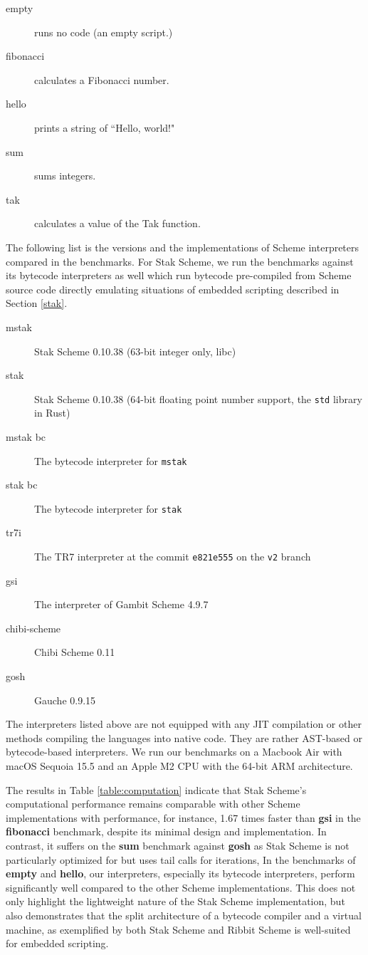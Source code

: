 \documentclass[sigplan]{acmart}
\begin{document}
\begin{description}
  \item[empty] runs no code (an empty script.)
  \item[fibonacci] calculates a Fibonacci number.
  \item[hello] prints a string of ``Hello, world!"
  \item[sum] sums integers.
  \item[tak] calculates a value of the Tak function.
\end{description}

The following list is the versions and the implementations of
Scheme interpreters compared in the benchmarks.
For Stak Scheme, we run the benchmarks against its bytecode interpreters as well
which run bytecode pre-compiled from Scheme source code directly
emulating situations of embedded scripting described in Section \ref{stak}.

\begin{description}
  \item[mstak] Stak Scheme 0.10.38 (63-bit integer only, libc)
  \item[stak] Stak Scheme 0.10.38 (64-bit floating point number support, the
    \texttt{std} library in Rust)
  \item[mstak bc] The bytecode interpreter for \texttt{mstak}
  \item[stak bc] The bytecode interpreter for \texttt{stak}
  \item[tr7i] The TR7 interpreter at the commit \texttt{e821e555}
    on the \texttt{v2} branch
  \item[gsi] The interpreter of Gambit Scheme 4.9.7
  \item[chibi-scheme] Chibi Scheme 0.11
  \item[gosh] Gauche 0.9.15
\end{description}

The interpreters listed above are not equipped with any JIT compilation
or other methods compiling the languages into native code.
They are rather AST-based or bytecode-based interpreters.
We run our benchmarks on a Macbook Air with macOS Sequoia 15.5 and an Apple
M2 CPU with the 64-bit ARM architecture.

The results in Table \ref{table:computation} indicate that Stak
Scheme's computational performance remains comparable with other
Scheme implementations with performance, for instance, 1.67 times
faster than \textbf{gsi} in the \textbf{fibonacci} benchmark,
despite its minimal design and implementation.
In contrast, it suffers on the \textbf{sum} benchmark against
\textbf{gosh} as Stak Scheme is not
particularly optimized for but uses tail calls for iterations,
In the benchmarks of \textbf{empty} and \textbf{hello}, our interpreters,
especially its bytecode interpreters, perform significantly well
compared to the other Scheme implementations.
This does not only highlight the lightweight nature of the Stak Scheme
implementation, but also demonstrates that
the split architecture of a bytecode compiler and a virtual machine,
as exemplified by both Stak Scheme and Ribbit Scheme is well-suited for
embedded scripting.
\end{document}
